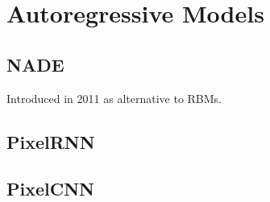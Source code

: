 \documentclass{article}
\begin{document}
\section{Autoregressive Models} 

\subsection{NADE}

Introduced in 2011 as alternative to RBMs. 

\subsection{PixelRNN} 


\subsection{PixelCNN}  





\end{document}
